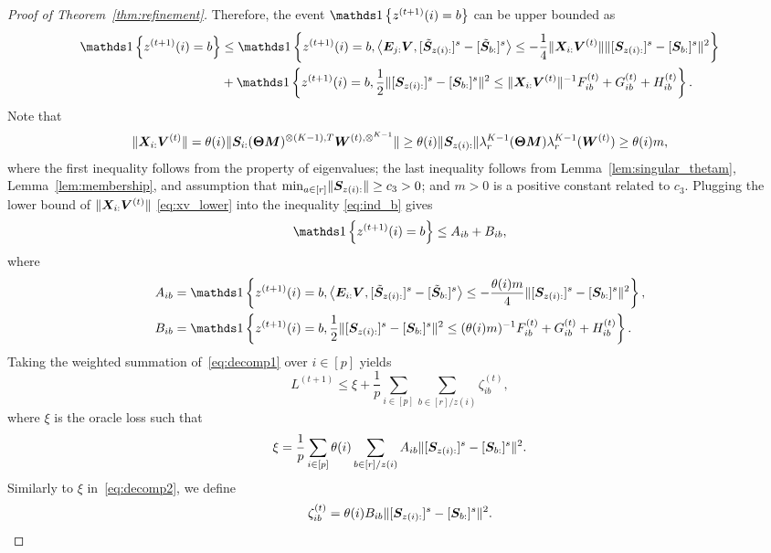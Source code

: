 \documentclass[lettersize,onecolumn,journal]{IEEEtran}
\theoremstyle{definition}
\theoremstyle{definition}
\newcommand{\offf}[1]{\left\{#1\right\}}
\newcommand{\ang}[1]{\left\langle#1\right\rangle}
\begin{document}
\begin{proof}[Proof of Theorem~\ref{thm:refinement}]
   Therefore, the event $ \ind \offf{ z^{(t+1)}(i) = b }$ can be upper bounded as
    \begin{align}
         \ind \offf{ z^{(t+1)}(i) = b  }& \leq \ind \offf{ z^{(t+1)}(i) = b ,   \ang{ \mE_{j:} \mV, [  \tilde \mS_{z(i):} ]^s - [  \tilde \mS_{b:} ]^s }  \leq - \frac{1}{4} \onormSize{}{\mX_{i:} \mV^{(t)}} \onormSize{}{ [ \mS_{z(i):}  ]^s - [ \mS_{b:}  ]^s  }^2 } \\
         & + \ind \offf{z^{(t+1)}(i) = b, \frac{1}{2}\onormSize{}{ [ \mS_{z(i):}  ]^s - [ \mS_{b:}  ]^s  }^2 \leq \onormSize{}{\mX_{i:} \mV^{(t)}}^{-1} F_{ib}^{(t)} + G_{ib}^{(t)} + H_{ib}^{(t)} }. \label{eq:ind_b}
    \end{align}
   Note that 
    \begin{align}
     \onormSize{}{\mX_{i:} \mV^{(t)}}  = \theta(i) \onormSize{}{\mS_{i:} (\mTheta \mM)^{\otimes (K-1),T} \mW^{(t), \otimes^{K-1}}}
         \geq \theta(i) \onormSize{}{\mS_{z(i):}} \lambda_r^{K-1}(\mTheta \mM) \lambda^{K-1}_r(\mW^{(t)})
         \geq\theta(i) m , \label{eq:xv_lower}
    \end{align}
    where the first inequality follows from the property of eigenvalues; the last inequality follows from Lemma~\ref{lem:singular_thetam}, Lemma~\ref{lem:membership}, and assumption that $\min_{a \in [r]} \lVert\bm S_{z(i):}\rVert \geq c_3>0$; and $m >0$ is a positive constant related to $ c_3$. Plugging the lower bound of $ \lVert\bm X_{i:} \bm{V}^{(t)}\rVert$ \eqref{eq:xv_lower} into the inequality \eqref{eq:ind_b} gives
    \begin{equation}\label{eq:decomp1}
        \ind \offf{ z^{(t+1)}(i) = b  } \leq A_{ib} + B_{ib},
    \end{equation}
    where 
    \begin{align}
        A_{ib} &= \ind \offf{z^{(t+1)}(i) = b, \ang{ \mE_{i:} \mV, [  \tilde \mS_{z(i):} ]^s - [  \tilde \mS_{b:} ]^s }  \leq - \frac{\theta(i) m}{4} \onormSize{}{ [ \mS_{z(i):}  ]^s - [ \mS_{b:}  ]^s  }^2 },\\
        B_{ib} &= \ind \offf{z^{(t+1)}(i) = b, \frac{1}{2}\onormSize{}{ [ \mS_{z(i):}  ]^s - [ \mS_{b:}  ]^s  }^2 \leq (\theta(i) m)^{-1} F_{ib}^{(t)} + G_{ib}^{(t)} + H_{ib}^{(t)} }.
    \end{align}
 Taking the weighted summation of~\eqref{eq:decomp1} over $i \in [p]$ yields 
    \begin{equation}
        L^{(t+1)} \leq \xi + \frac{1}{p}\sum_{i \in [p] }  \sum_{b \in [r]/z(i)}  \zeta_{ib}^{(t)}, 
    \end{equation}
    where $\xi$ is the oracle loss such that 
    \begin{equation}\label{eq:decomp2}
        \xi =   \frac{1}{p} \sum_{i \in [p] } \theta(i) \sum_{b \in [r]/z(i)} A_{ib} \onormSize{}{ [ \mS_{ z(i):}  ]^s - [ \mS_{b:}  ]^s  }^2.
    \end{equation}
    Similarly to $\xi$ in~\eqref{eq:decomp2}, we define
    \begin{equation}
        \zeta_{ib}^{(t)} =   \theta(i) B_{ib} \lVert [ \bm S_{ z(i):}  ]^s - [ \bm S_{b:}  ]^s  \rVert^2.
    \end{equation}
    

\end{proof}
\end{document}
